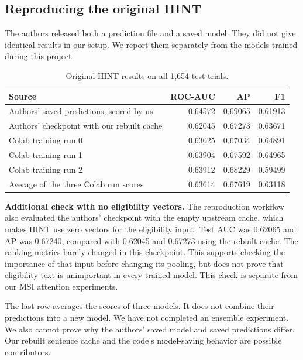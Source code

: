 \documentclass[10pt,letterpaper]{article}
\begin{document}
\subsection{Reproducing the original HINT}
The authors released both a prediction file and a saved model. They did not give identical results in our setup. We report them separately from the models trained during this project.

\begin{table}[H]
\centering\small
\caption{Original-HINT results on all 1,654 test trials.}
\begin{tabular}{lrrr}\toprule
Source & ROC-AUC & AP & F1\\\midrule
Authors' saved predictions, scored by us & 0.64572 & 0.69065 & 0.61913\\
Authors' checkpoint with our rebuilt cache & 0.62045 & 0.67273 & 0.63671\\
Colab training run 0 & 0.63025 & 0.67034 & 0.64891\\
Colab training run 1 & 0.63904 & 0.67592 & 0.64965\\
Colab training run 2 & 0.63912 & 0.68229 & 0.59499\\\midrule
Average of the three Colab run scores & 0.63614 & 0.67619 & 0.63118\\\bottomrule
\end{tabular}
\end{table}

\textbf{Additional check with no eligibility vectors.} The reproduction workflow also evaluated the authors' checkpoint with the empty upstream cache, which makes HINT use zero vectors for the eligibility input. Test AUC was 0.62065 and AP was 0.67240, compared with 0.62045 and 0.67273 using the rebuilt cache. The ranking metrics barely changed in this checkpoint. This supports checking the importance of that input before changing its pooling, but does not prove that eligibility text is unimportant in every trained model. This check is separate from our MSI attention experiments.

The last row averages the scores of three models. It does not combine their predictions into a new model. We have not completed an ensemble experiment. We also cannot prove why the authors' saved model and saved predictions differ. Our rebuilt sentence cache and the code's model-saving behavior are possible contributors.
\end{document}
